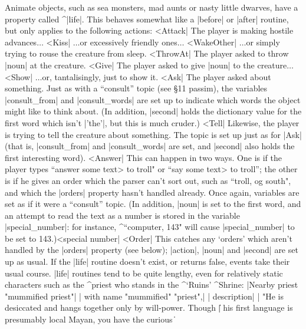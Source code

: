 {{Animate objects, such as sea monsters, mad aunts or nasty little dwarves,
have a property called ^|life|.  This behaves
somewhat like a |before| or |after| routine, but only applies to the
following actions:
\medskip
\stepin=60pt
^^|Attack|%
The player is making hostile advances$\ldots$
\medskip
{}^^|Kiss|%
$\ldots$or excessively friendly ones$\ldots$
\medskip
{}^^|WakeOther|%
$\ldots$or simply trying to rouse the creature from sleep.
\medskip
{}^^|ThrowAt|%
The player asked to throw |noun| at the creature.
\medskip
{}^^|Give|%
The player asked to give |noun| to the creature$\ldots$
\medskip
{}^^|Show|%
$\ldots$or, tantalisingly, just to show it.
\medskip
{}^^|Ask|%
The player asked about something.  Just as with a ``consult''
topic (see \S 11 passim), the variables |consult_from|
and |consult_words| are set up to indicate which words the
object might like to think about.  (In addition, |second|
holds the dictionary value for the first word which isn't
|'the'|, but this is much cruder.)
\medskip
{}^^|Tell|%
Likewise, the player is trying to tell the creature about
something.  The topic is set up just as for |Ask| (that is,
|consult_from| and |consult_words| are set, and |second|
also holds the first interesting word).
^^|Answer|%
This can happen in two ways.  One is if the player types ``answer \<some text>
to troll" or ``say \<some text> to troll''; the other is if he gives an
order which the parser can't sort out, such as
``troll, og south", and which the |orders| property hasn't handled
already.  Once again, variables are set as if it
were a ``consult'' topic.  (In addition, |noun| is set to the
first word, and an attempt to read the text as a number is
stored in the variable |special_number|: for instance,
^{``computer, 143"} will cause |special_number| to be set to
143.)^^|special number|
\medskip
{}^^|Order|%
This catches any `orders' which aren't
handled by the |orders| property (see below); |action|,
|noun| and |second| are set up as usual. 
\bigskip
\noindent 
If the |life| routine doesn't exist, or returns false, events take their
usual course.  |life| routines tend to be quite lengthy, even for
relatively static characters such as the ^{priest} who stands in
the ^{`Ruins'} ^{Shrine}:
\beginlines
|Nearby priest "mummified priest"|
|  with name "mummified" "priest",|
|       description|
|          "He is desiccated and hangs together only by will-power.  Though \|
|           his first language is presumably local Mayan, you have the curious \|
}}

